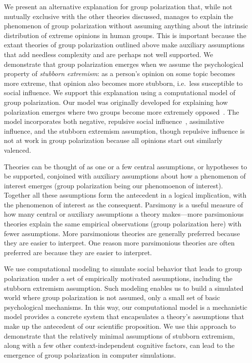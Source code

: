We present an alternative explanation for group polarization that, while not mutually exclusive with the other theories discussed, 
manages to explain the phenomenon of group polarization without assuming anything about the intrinsic distribution of extreme opinions in human groups. 
This is important because the extant theories of group polarization outlined above 
make auxiliary assumptions that add needless complexity and are perhaps not well supported.
We demonstrate that group polarization emerges when we assume the psychological
property of \emph{stubborn extremism}: as a person's opinion on
some topic becomes more extreme, that opinion also becomes more stubborn, 
i.e.\, less susceptible to social influence. 
We support this explanation using a computational model of group polarization. 
Our model was originally developed for explaining how polarization emerges
where two groups become more extremely opposed~\cite{Flache2011,Turner2018}.
The model incorporates both negative, repulsive social influence~\cite{Cikara2014}, assimilative influence,
and the stubborn extremism assumption, though repulsive influence is not at work
in group polarization because all opinions start out similarly valenced.   

Theories can be thought of as one or a few central assumptions, or hypotheses
to be supported, conjoined with
auxiliary assumptions about how a phenomenon of interest emerges (group polarization
being our phenomoenon of interest). Together all these assumptions form the antecedent in a logical implication,
with the phenomenon of interest as the consequent.
Parsimony is a useful measure of how many central or
auxiliary assumptions a theory makes---more parsimonious theories explain the same 
empirical observations (group polarization here) with fewer assumptions. 
More parsimonious theories are generally preferred because they are easier to 
interpret.  
One reason more parsimonious theories are often preferred are because they are
easier to interpret. 

We use computational modeling to simulate social behavior that leads to
group polarization under a set of empirically motivated assumptions, 
including the stubborn extremism assumption. 
Such modeling enables us to build a simulated world where group polarization is not assumed, only
a small set of basic psychological mechanisms. In this way, our computational 
model is a mechanistic model provides a concrete system that encapsulates
a theory's assumptions that make up the antecedent of our scientific proposition.
We use this approach to demonstrate that the relatively minimal assumptions
of stubborn extremism, along with a few other context-independent cognitive
factors, can lead to the emergence of group polarization in computer simulations.

